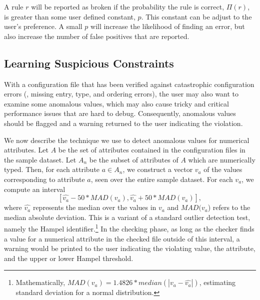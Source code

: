 

A rule $r$ will be reported as broken if the probability the rule is
correct, $\Pi(r)$, is greater than some user defined constant, $p$. This
constant can be adjust to the user's preference. A small $p$ will
increase the likelihood of finding an error, but also increase the
number of false positives that are reported.
\fi

\subsection{Learning Suspicious Constraints}
\label{subsec-constraints}

With a configuration file that has been verified against catastrophic
configuration errors (\eg, missing entry, type, and ordering errors), 
the user may also want to examine some anomalous values,
which may also cause tricky and critical performance
issues that are hard to debug.
Consequently, anomalous values should be flagged and a warning returned
to the user indicating the violation.

We now describe the technique we use to detect anomalous values for 
numerical attributes. Let $A$ be the set of attributes contained in the 
configuration files in the sample dataset. 
Let $A_n$ be the subset of attributes of $A$ which are numerically typed. 
Then, for each attribute $a \in A_n$, we construct a vector $v_a$ of the 
values corresponding to attribute $a$, seen over the entire sample dataset.
For each $v_a$, we compute 
an interval  $$[\hat{v_a} - 50*MAD(v_a), \hat{v_a} + 50*MAD(v_a)],$$ 
where $\hat{v_a}$ represents the median over the values 
in $v_a$ and $MAD(v_a$) refers to the 
median absolute deviation. 
This is a variant of a standard outlier detection test, namely the Hampel identifier.\footnote{Mathematically, $MAD(v_a) = 1.4826* median(|v_a - \hat{v_a}|)$, estimating standard deviation 
for a normal distribution.} 
In the checking phase, as long as the checker finds a value for a numerical 
attribute in the checked file outside of this interval, 
a warning would be printed to the user indicating the violating value, 
the attribute, and the upper or lower Hampel threshold. 

